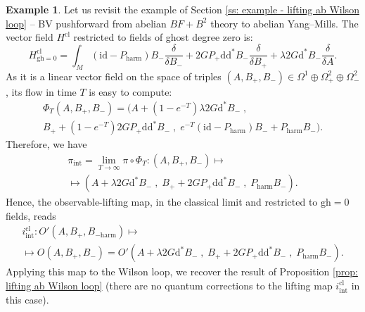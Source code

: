 \documentclass{amsart}
\theoremstyle{plain} %
\theoremstyle{definition}
\newtheorem{expl}[thm]{Example}
\theoremstyle{remark}
\newcommand{\mr}{\mathrm}
\newcommand{\ra}{\rightarrow}
\newcommand{\ii}{\mathrm{int}}
\newcommand{\cl}{\mathrm{cl}}
\newcommand{\dr}{\mathrm{d}}
\begin{document}
\begin{expl}
\label{example: H^cl for ab BF+B^2 to ab YM}
    Let us revisit the example of Section \ref{ss: example - lifting ab Wilson loop} -- BV pushforward from abelian $BF+B^2$ theory to abelian Yang--Mills. The vector field $H^\cl$ restricted to fields of ghost degree zero is:
    \begin{equation}
        H^\cl_{\mr{gh}=0}=\int_M (\mr{id}-P_\mr{harm})B_- \frac{\delta}{\delta B_-}+2G P_+ \dr \dr^* B_- \frac{\delta}{\delta B_+} + \lambda 2 G\dr^*B_- \frac{\delta}{\delta A}.
    \end{equation}
    As it is a linear vector field on the space of triples $(A,B_+,B_-)\in \Omega^1\oplus \Omega^2_+\oplus \Omega^2_-$, its flow in time $T$ is easy to compute:
    \begin{multline}
        \Phi_T(A,B_+,B_-)=(A+(1-e^{-T})\lambda 2G \dr^* B_-\;,\\ B_+ +(1-e^{-T}) 2G P_+ \dr \dr^* B_-\;,\;
        e^{-T}(\mr{id}-P_\mr{harm})B_-+P_\mr{harm}B_-).
    \end{multline}
    Therefore, we have
    \begin{multline}\label{ab BF+BB: pi_int}
        \pi_\ii =\lim_{T\ra\infty} \pi\circ\Phi_T \colon (A,B_+,B_-)\mapsto \\
        \mapsto (A+\lambda 2G \dr^* B_-\;,\; B_++2G P_+ \dr \dr^* B_- \;,\; P_\mr{harm}B_-).
    \end{multline}
    Hence, the observable-lifting map, in the classical limit and restricted to $\mr{gh}=0$ fields, reads
    \begin{multline}
        i_\ii^\cl\colon O'(A,B_+,B_{-\mr{harm}}) \mapsto\\
        \mapsto O(A,B_+,B_-)= O'(A+\lambda 2G \dr^* B_-\;,\;B_++2G P_+ \dr \dr^* B_-\;,\;P_\mr{harm}B_-).
    \end{multline}
    Applying this map to the Wilson loop, we recover the result of Proposition \ref{prop: lifting ab Wilson loop} (there are no quantum corrections to the lifting map $i_\ii^\cl$ in this case).


\end{expl}
\end{document}

